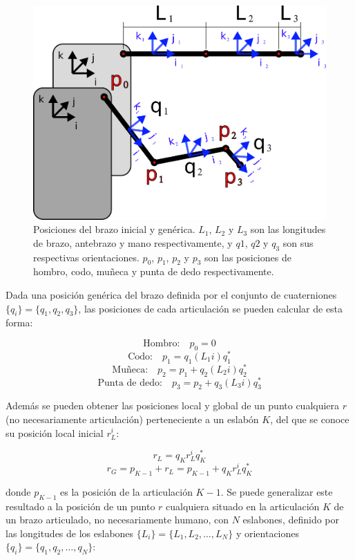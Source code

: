 \documentclass[12pt, a4paper]{report}
\begin{document}
\begin{figure}[h] 
	\centering
		\includegraphics[scale=0.6]{../img/arm_position.png} 
	\caption[Posiciones del brazo inicial y genérica]{Posiciones del brazo inicial y genérica. $L_1$, $L_2$ y $L_3$ son las longitudes de brazo, antebrazo y mano respectivamente, y $q1$, $q2$ y $q_3$ son sus respectivas orientaciones. $p_0$, $p_1$, $p_2$ y $p_3$ son las posiciones de hombro, codo, muñeca y punta de dedo respectivamente.}
	\label{fig: posiciones_brazo}
\end{figure}

Dada una posición genérica del brazo definida por el conjunto de cuaterniones $\{q_i\} = \{q_1, q_2, q_3\}$, las posiciones de cada articulación se pueden calcular de esta forma:

$$ \text{Hombro:} \quad p_0 = 0 $$
$$ \text{Codo:} \quad p_1 = q_1(L_1i)q_1^* $$
$$ \text{Muñeca:} \quad p_2 = p_1 + q_2(L_2i)q_2^* $$
$$ \text{Punta de dedo:} \quad p_3 = p_2 + q_3(L_3i)q_3^* $$

Además se pueden obtener las posiciones local y global de un punto cualquiera $r$ (no necesariamente articulación) perteneciente a un eslabón $K$, del que se conoce su posición local inicial $r_L^i$:

$$ r_L = q_Kr_L^iq_K^* $$
$$ r_G = p_{K-1} + r_L = p_{K-1} + q_Kr_L^iq_K^* $$

donde $p_{K-1}$ es la posición de la articulación $K-1$. Se puede generalizar este resultado a la posición de un punto $r$ cualquiera situado en la articulación $K$ de un brazo articulado, no necesariamente humano, con $N$ eslabones, definido por las longitudes de los eslabones $\{L_i\} = \{L_1, L_2, \ldots , L_N\}$ y orientaciones $\{q_i\} = \{q_1, q_2, \ldots, q_N\}$:
\end{document}
